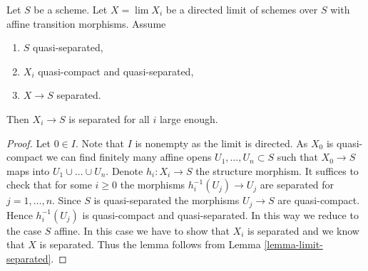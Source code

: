 \begin{lemma}
\label{lemma-eventually-separated}
Let $S$ be a scheme. Let $X = \lim X_i$ be a directed
limit of schemes over $S$ with affine transition morphisms.
Assume
\begin{enumerate}
\item $S$ quasi-separated,
\item $X_i$ quasi-compact and quasi-separated,
\item $X \to S$ separated.
\end{enumerate}
Then $X_i \to S$ is separated for all $i$ large enough.
\end{lemma}

\begin{proof}
Let $0 \in I$. Note that $I$ is nonempty as the limit is directed.
As $X_0$ is quasi-compact we can find finitely many
affine opens $U_1, \ldots, U_n \subset S$ such that
$X_0 \to S$ maps into $U_1 \cup \ldots \cup U_n$.
Denote $h_i : X_i \to S$ the structure morphism.
It suffices to check that for some $i \geq 0$ the morphisms
$h_i^{-1}(U_j) \to U_j$ are separated for $j = 1, \ldots,  n$.
Since $S$ is quasi-separated the morphisms $U_j \to S$ are quasi-compact.
Hence $h_i^{-1}(U_j)$ is quasi-compact and quasi-separated.
In this way we reduce to the case $S$ affine. In this case we
have to show that $X_i$ is separated and we know that $X$ is separated.
Thus the lemma follows from Lemma \ref{lemma-limit-separated}.
\end{proof}
